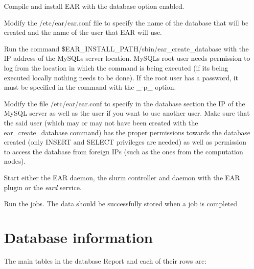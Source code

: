 
\begin{DoxyEnumerate}
\item Compile and install E\+AR with the database option enabled.
\item Modify the /etc/ear/ear.conf file to specify the name of the database that will be created and the name of the user that E\+AR will use.
\item Run the command \$\+E\+A\+R\+\_\+\+I\+N\+S\+T\+A\+L\+L\+\_\+\+P\+A\+TH/sbin/ear\+\_\+create\+\_\+database with the IP address of the My\+S\+QL\textquotesingle{}s server location. My\+S\+QL\textquotesingle{}s root user needs permission to log from the location in which the command is being executed (if it\textquotesingle{}s being executed locally nothing needs to be done). If the root user has a password, it must be specified in the command with the \+\_\+-\/p\+\_\+ option.
\item Modify the file /etc/ear/ear.conf to specify in the database section the IP of the My\+S\+QL server as well as the user if you want to use another user. Make sure that the said user (which may or may not have been created with the ear\+\_\+create\+\_\+database command) has the proper permissions towards the database created (only I\+N\+S\+E\+RT and S\+E\+L\+E\+CT privileges are needed) as well as permission to access the database from foreign I\+Ps (such as the ones from the computation nodes).
\item Start either the E\+AR daemon, the slurm controller and daemon with the E\+AR plugin or the {\itshape eard} service.
\item Run the jobs. The data should be successfully stored when a job is completed
\end{DoxyEnumerate}

\section*{Database information}

The main tables in the database Report and each of their rows are\+:


